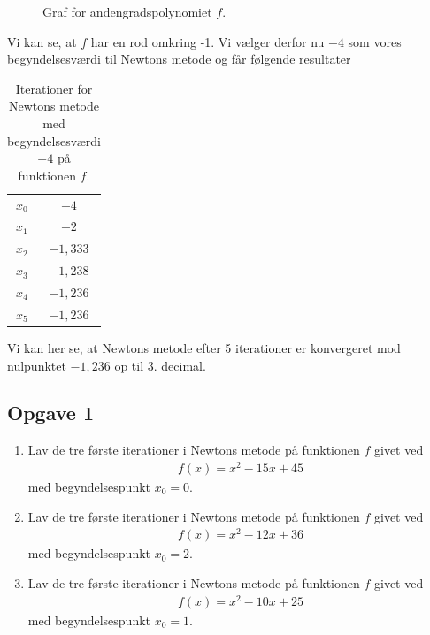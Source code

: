 \begin{exa}
	\begin{figure}[H]
		\centering
		\caption{Graf for andengradspolynomiet $f$.}
	\end{figure}
	Vi kan se, at $f$ har en rod omkring -1. Vi vælger derfor nu $-4$ som vores begyndelsesværdi til Newtons metode og får følgende resultater
	\begin{table}[H]
		\centering
		\begin{tabular}{cc}
		$x_0$ & $-4$ \\
		$x_1$ & $-2$ \\
		$x_2$ & $-1,\!333$ \\
		$x_3$ & $-1,\!238$ \\
		$x_4$ & $-1,\!236$ \\
		$x_5$ & $-1,\!236$ \\
		\end{tabular}
		\caption{Iterationer for Newtons metode med begyndelsesværdi $-4$ på funktionen $f$.}
	\end{table}
	Vi kan her se, at Newtons metode efter 5 iterationer er konvergeret mod nulpunktet $-1,\!236$ op til 3. decimal.
\end{exa}
\newpage
\subsection*{Opgave 1}

\begin{enumerate}[label = \roman*)]
	\item Lav de tre første iterationer i Newtons metode på funktionen $f$ givet ved
	\begin{align*}
		f(x) = x^2 - 15x + 45
	\end{align*}
	med begyndelsespunkt $x_0 = 0$. 
	\item Lav de tre første iterationer i Newtons metode på funktionen $f$ givet ved
	\begin{align*}
		f(x) = x^2 - 12x + 36
	\end{align*}
	med begyndelsespunkt $x_0 = 2$. 
	\item Lav de tre første iterationer i Newtons metode på funktionen $f$ givet ved
	\begin{align*}
		f(x) =	x^2 - 10x + 25
	\end{align*}
	med begyndelsespunkt $x_0 = 1$. 
\end{enumerate}


